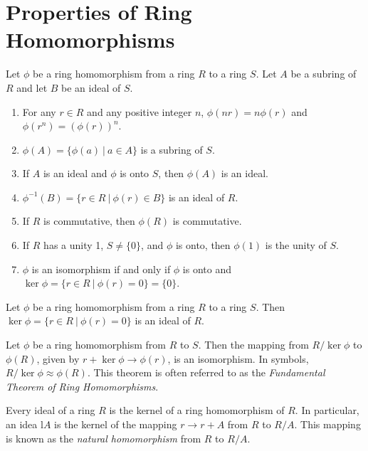 \section{Properties of Ring Homomorphisms}

\begin{theorem}
	Let $\phi$ be a ring homomorphism from a ring $R$ to a ring $S$. Let $A$ be a subring of $R$ and let $B$ be an ideal of $S$.
	\begin{enumerate}
		\item For any $r \in R$ and any positive integer $n$, $\phi(nr) = n\phi(r)$ and $\phi(r^n) = (\phi(r))^n$.
		\item $\phi(A) = \{\phi(a)\ \vert\ a \in A\}$ is a subring of $S$.
		\item If $A$ is an ideal and $\phi$ is onto $S$, then $\phi(A)$ is an ideal.
		\item $\phi^{-1}(B) = \{r \in R\ \vert\ \phi(r) \in B\}$ is an ideal of $R$.
		\item If $R$ is commutative, then $\phi(R)$ is commutative.
		\item If $R$ has a unity 1, $S \neq \{0\}$, and $\phi$ is onto, then $\phi(1)$ is the unity of $S$.
		\item $\phi$ is an isomorphism if and only if $\phi$ is onto and $\ker \phi = \{r \in R\ \vert\ \phi(r) = 0\} = \{0\}$.
	\end{enumerate}
\end{theorem}

\begin{theorem}
	Let $\phi$ be a ring homomorphism from a ring $R$ to a ring $S$. Then $\ker \phi = \{r \in R\ \vert\ \phi(r) = 0\}$ is an ideal of $R$.
\end{theorem}

\begin{theorem}
	Let $\phi$ be a ring homomorphism from $R$ to $S$. Then the mapping from $R/\ker \phi$ to $\phi(R)$, given by $r + \ker \phi \to \phi(r)$, is an isomorphism. In symbols, $R/\ker\phi\approx\phi(R)$. This theorem is often referred to as the \textit{Fundamental Theorem of Ring Homomorphisms}.
\end{theorem}

\begin{theorem}
	Every ideal of a ring $R$ is the kernel of a ring homomorphism of $R$. In particular, an idea l$A$ is the kernel of the mapping $r \to r + A$ from $R$ to $R/A$. This mapping is known as the \textit{natural homomorphism} from $R$ to $R/A$.
\end{theorem}

